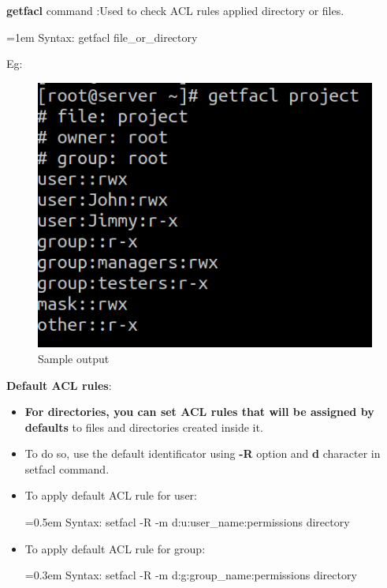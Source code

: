 \begin{flushleft}
	\bigskip
	\textbf{getfacl} command :Used to check ACL rules applied directory or files.
	\bigskip
	\begin{tcolorbox}[breakable,notitle,boxrule=-0pt,colback=pink,colframe=pink]
		\color{black}
		\font=1em
		Syntax: getfacl  file\_or\_directory
		\font=4pt
	\end{tcolorbox}
	Eg:
	\begin{figure}[h!]
		\centering
		\includegraphics[scale=0.6]{content/chapter6/images/getfacl.png}
		\caption{Sample output}
		\label{fig:getfacl}
	\end{figure}
	
	
\newpage

\textbf{Default ACL rules}: 
\begin{itemize}
	\item \textbf{For directories, you can set ACL rules that will be assigned by defaults} to files and directories created inside it. 
	\item To do so, use the default identificator using \textbf{-R} option and \textbf{d} character in setfacl command.
	\item To apply default ACL rule for user:
	\bigskip
	\begin{tcolorbox}[breakable,notitle,boxrule=-0pt,colback=pink,colframe=pink]
		\color{black}
		\font=0.5em
		Syntax: setfacl -R -m d:u:user\_name:permissions directory
		\font=4pt
	\end{tcolorbox}

	\item To apply default ACL rule for group:
	\bigskip
	\begin{tcolorbox}[breakable,notitle,boxrule=-0pt,colback=pink,colframe=pink]
		\color{black}
		\font=0.3em
		Syntax: setfacl -R -m d:g:group\_name:permissions directory
		\font=4pt
	\end{tcolorbox}


\end{itemize}
\end{flushleft}
